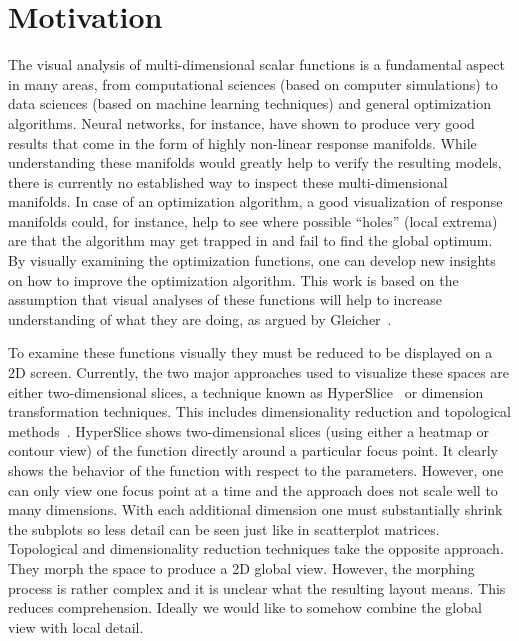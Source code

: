 \section{Motivation}\label{motivation}

The visual analysis of multi-dimensional scalar functions is a fundamental aspect in many areas, from computational sciences (based on computer simulations) to data sciences (based on machine learning techniques) and general optimization algorithms. 
Neural networks, for instance, have shown to produce very good results that come in the form of highly non-linear response manifolds.
While understanding these manifolds would greatly help to verify
the resulting models, there
is currently no established way to inspect these multi-dimensional manifolds. %
In case of an optimization algorithm, a good visualization of response manifolds could, for instance, help to see where possible
``holes'' (local extrema) are that the algorithm may get trapped in and fail to find the
global optimum. By visually examining the optimization functions,
one can develop new insights on how to improve the optimization
algorithm. This work is based on the assumption that visual analyses of these functions will help to increase
understanding of what they are doing, 
as argued by Gleicher~\cite{Gleicher:2016}.

To examine these functions visually they must be reduced to be
displayed on a 2D screen. 
Currently, the two major approaches used to visualize these spaces are either
two-dimensional slices, a technique known as HyperSlice~\cite{Wijk:1993} or dimension transformation techniques. This includes dimensionality
reduction and topological methods~\cite{Correa:2011,Carr:2003a}.  HyperSlice
shows two-dimensional slices (using either a heatmap or contour view)
of the function directly around a particular focus point. It clearly shows the
behavior of the function with respect to the parameters. However, one can only
view one focus point at a time and 
the approach does not scale well to many dimensions.
With each additional dimension one must substantially 
shrink the subplots so less detail can be seen just like in scatterplot matrices. Topological and dimensionality
reduction techniques take the opposite approach. They morph the space to
produce a 2D global view. However, the morphing process is rather
complex and it is unclear what the resulting layout means. This reduces
comprehension. Ideally we would like to somehow combine the global view with
local detail.

